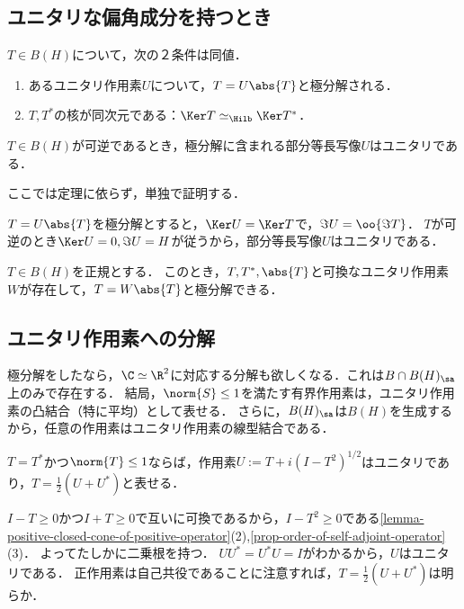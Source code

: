 \documentclass[uplatex,dvipdfmx]{jsreport}
\begin{document}
\subsection{ユニタリな偏角成分を持つとき}

\begin{theorem}
    $T\in B(H)$について，次の２条件は同値．
    \begin{enumerate}
        \item あるユニタリ作用素$U$について，$T=U\abs{T}$と極分解される．
        \item $T,T^*$の核が同次元である：$\Ker T\simeq_\Hilb\Ker T^*$．
    \end{enumerate}
\end{theorem}

\begin{corollary}\label{cor-polar-decomposition-of-invertible-operators}
    $T\in B(H)$が可逆であるとき，極分解に含まれる部分等長写像$U$はユニタリである．
\end{corollary}
\begin{Proof}
    ここでは定理に依らず，単独で証明する．

    $T=U\abs{T}$を極分解とすると，$\Ker U=\Ker T$で，$\Im U=\oo{\Im T}$．
    $T$が可逆のとき$\Ker U=0,\Im U=H$が従うから，部分等長写像$U$はユニタリである．
\end{Proof}

\begin{corollary}
    $T\in B(H)$を正規とする．
    このとき，$T,T^*,\abs{T}$と可換なユニタリ作用素$W$が存在して，$T=W\abs{T}$と極分解できる．
\end{corollary}

\subsection{ユニタリ作用素への分解}

\begin{tcolorbox}[colframe=ForestGreen, colback=ForestGreen!10!white,breakable,colbacktitle=ForestGreen!40!white,coltitle=black,fonttitle=\bfseries\sffamily,
title=ユニタリ作用素への分解]
    極分解をしたなら，$\C\simeq\R^2$に対応する分解も欲しくなる．これは$B\cap B(H)_\sa$上のみで存在する．
    結局，$\norm{S}\le 1$を満たす有界作用素は，ユニタリ作用素の凸結合（特に平均）として表せる．
    さらに，$B(H)_\sa$は$B(H)$を生成するから，任意の作用素はユニタリ作用素の線型結合である．
\end{tcolorbox}

\begin{lemma}[単位球内の自己共役作用素の表示]
    $T=T^*$かつ$\norm{T}\le 1$ならば，作用素$U:=T+i(I-T^2)^{1/2}$はユニタリであり，$T=\frac{1}{2}(U+U^*)$と表せる．
\end{lemma}
\begin{Proof}
    $I-T\ge0$かつ$I+T\ge0$で互いに可換であるから，$I-T^2\ge0$である\ref{lemma-positive-closed-cone-of-positive-operator}(2),\ref{prop-order-of-self-adjoint-operator}(3)．
    よってたしかに二乗根を持つ．
    $UU^*=U^*U=I$がわかるから，$U$はユニタリである．
    正作用素は自己共役であることに注意すれば，$T=\frac{1}{2}(U+U^*)$は明らか．
\end{Proof}
\end{document}
